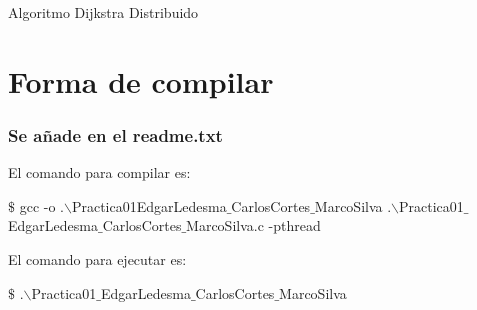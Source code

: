 \documentclass[a4paper,12pt]{article}
\begin{document}

\newpage



\newpage

\begin{center}
    {\huge Algoritmo Dijkstra Distribuido}
\end{center}

\section*{Forma de compilar}
\subsubsection*{Se añade en el readme.txt}

El comando para compilar es:
\begin{center}
    $\$$ gcc -o .$\backslash$Practica01EdgarLedesma$\_$CarlosCortes$\_$MarcoSilva .$\backslash$Practica01$\_$EdgarLedesma$\_$CarlosCortes$\_$MarcoSilva.c -pthread
\end{center}

El comando para ejecutar es:

\begin{center}
    $\$$ .$\backslash$Practica01$\_$EdgarLedesma$\_$CarlosCortes$\_$MarcoSilva
\end{center}
\end{document}
